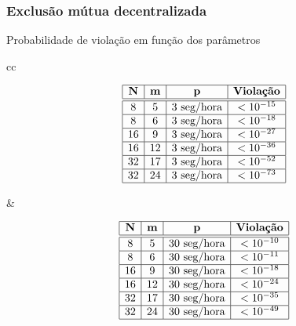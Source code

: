 \documentclass[Ligatures=TeX,table,brazil,svgnames,usetotalslideindicator,compress,10pt]{beamer}
\begin{document}
\begin{frame}
  \frametitle{Exclusão mútua decentralizada}

    \begin{block}{Probabilidade de violação em função dos parâmetros}
    \begin{center}
      \small\footnotesize
      \renewcommand{\arraystretch}{1.1}
      \begin{tabular}{cc}
        \begin{minipage}{0.4\textwidth}
          \[
          \begin{array}{|c|c|c|c|}\hline
            \mathbf{N}  & \mathbf{m} & \mathbf{p}        & \mbox{\textbf{Violação}} \\ \hline\hline
            8           & 5          & \mbox{3 seg/hora} & < 10^{-15} \\ \hline
            8           & 6          & \mbox{3 seg/hora} & < 10^{-18} \\ \hline
            16          & 9          & \mbox{3 seg/hora} & < 10^{-27} \\ \hline
            16          & 12         & \mbox{3 seg/hora} & < 10^{-36} \\ \hline
            32          & 17         & \mbox{3 seg/hora} & < 10^{-52} \\ \hline
            32          & 24         & \mbox{3 seg/hora} & < 10^{-73} \\ \hline
          \end{array}
          \]
        \end{minipage} &
        \begin{minipage}{0.4\textwidth}
          \[
          \begin{array}{|c|c|c|c|}\hline
            \mathbf{N}  & \mathbf{m} & \mathbf{p}        & \mbox{\textbf{Violação}} \\ \hline\hline
            8           & 5          & \mbox{30 seg/hora} & < 10^{-10} \\ \hline
            8           & 6          & \mbox{30 seg/hora} & < 10^{-11} \\ \hline
            16          & 9          & \mbox{30 seg/hora} & < 10^{-18} \\ \hline
            16          & 12         & \mbox{30 seg/hora} & < 10^{-24} \\ \hline
            32          & 17         & \mbox{30 seg/hora} & < 10^{-35} \\ \hline
            32          & 24         & \mbox{30 seg/hora} & < 10^{-49} \\ \hline
          \end{array}
          \]
        \end{minipage}
      \end{tabular}
    \end{center}
  \end{block}
\end{frame}
\end{document}
